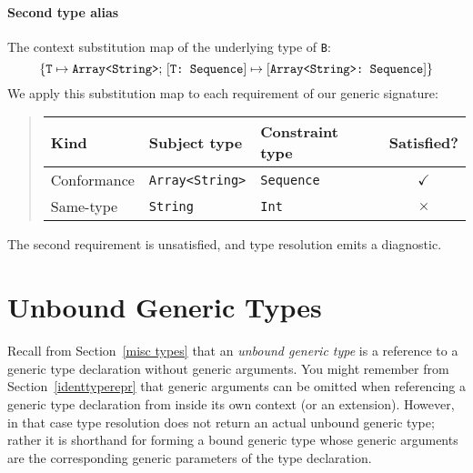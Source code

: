 \documentclass[../generics]{subfiles}
\begin{document}
\begin{example}
\paragraph{Second type alias} The context substitution map of the underlying type of \texttt{B}:
\[
\{\texttt{T} \mapsto \texttt{Array<String>};\,[\texttt{T:~Sequence}] \mapsto [\texttt{Array<String>:~Sequence}]\}
\]
We apply this substitution map to each requirement of our generic signature:
\begin{quote}
\begin{tabular}{|l|l|l|c|}
\hline
Kind&Subject type&Constraint type&Satisfied?\\
\hline
Conformance&\texttt{Array<String>}&\texttt{Sequence}&$\checkmark$\\
Same-type&\texttt{String}&\texttt{Int}&$\times$\\
\hline
\end{tabular}
\end{quote}
The second requirement is unsatisfied, and type resolution emits a diagnostic.
\end{example}

\section{Unbound Generic Types}\label{unbound generic types}

Recall from Section~\ref{misc types} that an \emph{unbound generic type} is a reference to a generic type declaration without generic arguments. You might remember from Section~\ref{identtyperepr} that generic arguments can be omitted when referencing a generic type declaration from inside its own context (or an extension). However, in that case type resolution does not return an actual unbound generic type; rather it is shorthand for forming a bound generic type whose generic arguments are the corresponding generic parameters of the type declaration.
\end{document}
